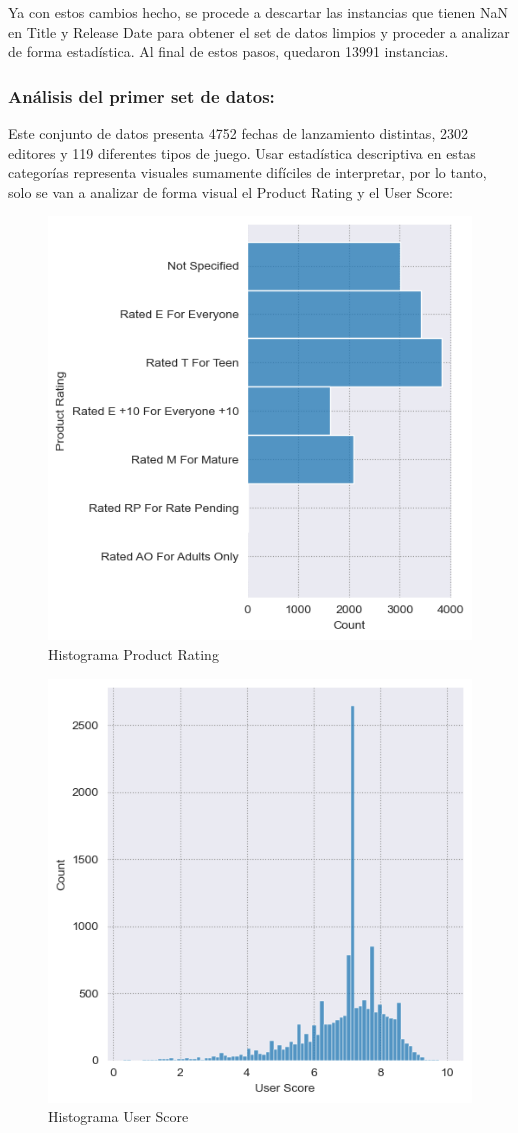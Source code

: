 \documentclass[a4paper]{article}
\begin{document}
    Ya con estos cambios hecho, se procede a descartar las instancias que tienen NaN en Title y Release Date para obtener el set de datos limpios y proceder a analizar de forma estad\'{i}stica. Al final de estos pasos, quedaron 13991 instancias.

\subsubsection{Análisis del primer set de datos:}
Este conjunto de datos presenta 4752 fechas de lanzamiento distintas, 2302 editores y 119 diferentes tipos de juego. Usar estadística descriptiva en estas categorías representa visuales sumamente difíciles de interpretar, por lo tanto, solo se van a analizar de forma visual el Product Rating y el User Score:\newpage

    \begin{figure}[hbtp!]
        \centering
        \includegraphics[width=0.5\linewidth]{Module_4_BigData//Proyecto//Propuestas//Imagenes/dataset1_ProductRating_histogram.png}
        \caption{Histograma Product Rating}
        \label{fig:hist_product_rating}
    \end{figure}

    \begin{figure}[hbtp!]
        \centering
        \includegraphics[width=0.5\linewidth]{Module_4_BigData//Proyecto//Propuestas//Imagenes/dataset1_UserScore_histogram.png}
        \caption{Histograma User Score}
        \label{fig:hist_user_score}
    \end{figure}
\end{document}
